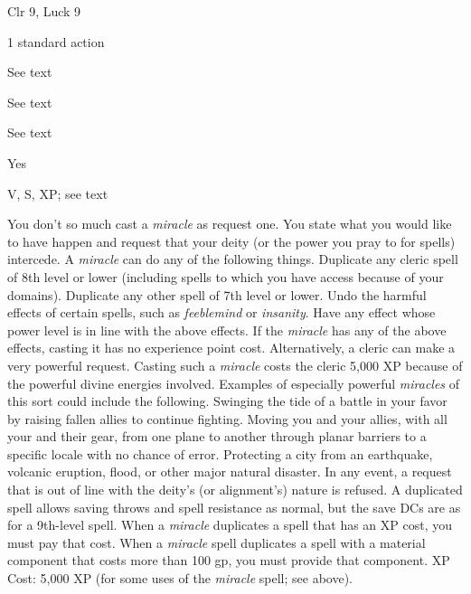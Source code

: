 
\begin{description*}
\item[Level:] Clr 9, Luck 9
\item[Casting Time:] 1 standard action
\item[Range:] See text
\item[Duration:] See text
\item[Saving Throw:] See text
\item[Spell Resistance:] Yes
\item[Components:] V, S, XP; see text
\end{description*}

You don't so much cast a \textit{miracle} as request one. You state what you would
like to have happen and request that your deity (or the power you pray to for spells)
intercede.
A \textit{miracle} can do any of the following things.%
Duplicate any cleric spell of 8th level or lower (including spells to which you
have access because of your domains). %
Duplicate any other spell of 7th level or lower.%
Undo the harmful effects of certain spells, such as \textit{feeblemind} or \textit{insanity}.%
Have any effect whose power level is in line with the above effects.
If the \textit{miracle} has any of the above effects, casting it has no experience
point cost.
Alternatively, a cleric can make a very powerful request. Casting such a \textit{miracle
}costs the cleric 5,000 XP because of the powerful divine energies involved. Examples
of especially powerful \textit{miracles} of this sort could include the following.%
Swinging the tide of a battle in your favor by raising fallen allies to continue
fighting.%
Moving you and your allies, with all your and their gear, from one plane to another
through planar barriers to a specific locale with no chance of error.%
Protecting a city from an earthquake, volcanic eruption, flood, or other major
natural disaster.
In any event, a request that is out of line with the deity's (or alignment's) nature
is refused.
A duplicated spell allows saving throws and spell resistance as normal, but the
save DCs are as for a 9th-level spell. When a \textit{miracle} duplicates a spell
that has an XP cost, you must pay that cost. When a \textit{miracle} spell duplicates
a spell with a material component that costs more than 100 gp, you must provide
that component.
XP Cost: 5,000 XP (for some uses of the \textit{miracle} spell; see above).